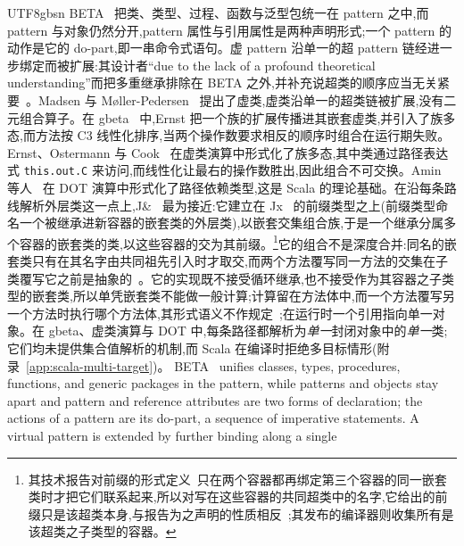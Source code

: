 \begin{CJK*}{UTF8}{gbsn}
BETA~\cite{kristensen1983-beta-abstraction-mechanisms} 把类、类型、过程、函数与泛型包统一在 pattern 之中,而 pattern 与对象仍然分开,pattern 属性与引用属性是两种声明形式;一个 pattern 的动作是它的 do-part,即一串命令式语句。虚 pattern 沿单一的超 pattern 链经进一步绑定而被扩展:其设计者“due to the lack of a profound theoretical understanding”而把多重继承排除在 BETA 之外,并补充说超类的顺序应当无关紧要~\cite[p.~103]{madsen1993-beta-programming-language}。Madsen 与 M{\o}ller-Pedersen~\cite{madsen1989-virtual-classes} 提出了虚类,虚类沿单一的超类链被扩展,没有二元组合算子。在 gbeta~\cite{ernst1999-gbeta, ernst2001-family-polymorphism} 中,Ernst 把一个族的扩展传播进其嵌套虚类,并引入了族多态,而方法按 C3 线性化排序,当两个操作数要求相反的顺序时组合在运行期失败。Ernst、Ostermann 与 Cook~\cite{ernst2006-virtual-class-calculus} 在虚类演算中形式化了族多态,其中类通过路径表达式 \texttt{this.out.C} 来访问,而线性化让最右的操作数胜出,因此组合不可交换。Amin 等人~\cite{amin2016-dependent-object-types} 在 DOT 演算中形式化了路径依赖类型,这是 Scala 的理论基础。在沿每条路线解析外层类这一点上,J\&~\cite{nystrom2006-nested-intersection} 最为接近:它建立在 Jx~\cite{nystrom2004-nested-inheritance} 的前缀类型之上(前缀类型命名一个被继承进新容器的嵌套类的外层类),以嵌套交集组合族,于是一个继承分属多个容器的嵌套类的类,以这些容器的交为其前缀。\footnote{其技术报告对前缀的形式定义~\cite[图~12]{nystrom2006-nested-intersection-report}只在两个容器都再绑定第三个容器的同一嵌套类时才把它们联系起来,所以对写在这些容器的共同超类中的名字,它给出的前缀只是该超类本身,与报告为之声明的性质相反~\cite[附录~A.3]{nystrom2006-nested-intersection-report};其发布的编译器则收集所有是该超类之子类型的容器。}它的组合不是深度合并:同名的嵌套类只有在其名字由共同祖先引入时才取交,而两个方法覆写同一方法的交集在子类覆写它之前是抽象的~\cite[第~3.3~节]{nystrom2006-nested-intersection}。它的实现既不接受循环继承,也不接受作为其容器之子类型的嵌套类,所以单凭嵌套类不能做一般计算;计算留在方法体中,而一个方法覆写另一个方法时执行哪个方法体,其形式语义不作规定~\cite[附录~A]{nystrom2006-nested-intersection-report};在运行时一个引用指向单一对象。在 gbeta、虚类演算与 DOT 中,每条路径都解析为\emph{单一}封闭对象中的\emph{单一}类;它们均未提供集合值解析的机制,而 Scala 在编译时拒绝多目标情形(附录~\ref{app:scala-multi-target})。
\else
BETA~\cite{kristensen1983-beta-abstraction-mechanisms} unifies
classes, types, procedures, functions, and generic packages in the
pattern, while patterns and objects stay apart and pattern and
reference attributes are two forms of declaration; the actions of a
pattern are its do-part, a sequence of imperative statements.
A virtual pattern is extended by further binding along a single

\end{CJK*}
